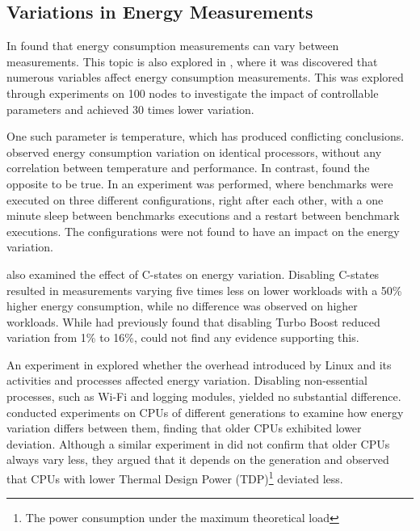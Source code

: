 \subsection{Variations in Energy Measurements}


In \cite{biksbois} found that energy consumption measurements can vary between measurements. This topic is also explored in \cite{Ournani2020}, where it was discovered that numerous variables affect energy consumption measurements. This was explored through experiments on 100 nodes to investigate the impact of controllable parameters and achieved 30 times lower variation.

One such parameter is temperature, which has produced conflicting conclusions. \cite{Kistowski2016} observed energy consumption variation on identical processors, without any correlation between temperature and performance. In contrast, \cite{Wang2018} found the opposite to be true. In \cite{Ournani2020} an experiment was performed, where benchmarks were executed on three different configurations, right after each other, with a one minute sleep between benchmarks executions and a restart between benchmark executions. The configurations were not found to have an impact on the energy variation. 

\cite{Ournani2020} also examined the effect of C-states on energy variation. Disabling C-states resulted in measurements varying five times less on lower workloads with a 50\% higher energy consumption, while no difference was observed on higher workloads. While \cite{Acun2016} had previously found that disabling Turbo Boost reduced variation from 1\% to 16\%, \cite{Ournani2020} could not find any evidence supporting this.


An experiment in \cite{Ournani2020} explored whether the overhead introduced by Linux and its activities and processes affected energy variation. Disabling non-essential processes, such as Wi-Fi and logging modules, yielded no substantial difference. \cite{Marathe2017, Wang2019} conducted experiments on CPUs of different generations to examine how energy variation differs between them, finding that older CPUs exhibited lower deviation. Although a similar experiment in \cite{Ournani2020} did not confirm that older CPUs always vary less, they argued that it depends on the generation and observed that CPUs with lower Thermal Design Power (TDP)\footnote{The power consumption under the maximum theoretical load\cite{tdp}} deviated less.


